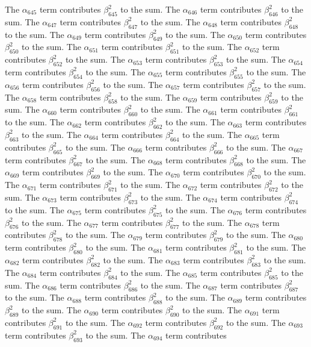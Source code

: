 \begin{lemma}
The $\alpha_{645}$ term contributes $\beta_{645}^{2}$ to the sum. The $\alpha_{646}$ term contributes $\beta_{646}^{2}$ to the sum. The $\alpha_{647}$ term contributes $\beta_{647}^{2}$ to the sum. The $\alpha_{648}$ term contributes $\beta_{648}^{2}$ to the sum. The $\alpha_{649}$ term contributes $\beta_{649}^{2}$ to the sum. The $\alpha_{650}$ term contributes $\beta_{650}^{2}$ to the sum. The $\alpha_{651}$ term contributes $\beta_{651}^{2}$ to the sum. The $\alpha_{652}$ term contributes $\beta_{652}^{2}$ to the sum. The $\alpha_{653}$ term contributes $\beta_{653}^{2}$ to the sum. The $\alpha_{654}$ term contributes $\beta_{654}^{2}$ to the sum. The $\alpha_{655}$ term contributes $\beta_{655}^{2}$ to the sum. The $\alpha_{656}$ term contributes $\beta_{656}^{2}$ to the sum. The $\alpha_{657}$ term contributes $\beta_{657}^{2}$ to the sum. The $\alpha_{658}$ term contributes $\beta_{658}^{2}$ to the sum. The $\alpha_{659}$ term contributes $\beta_{659}^{2}$ to the sum. The $\alpha_{660}$ term contributes $\beta_{660}^{2}$ to the sum. The $\alpha_{661}$ term contributes $\beta_{661}^{2}$ to the sum. The $\alpha_{662}$ term contributes $\beta_{662}^{2}$ to the sum. The $\alpha_{663}$ term contributes $\beta_{663}^{2}$ to the sum. The $\alpha_{664}$ term contributes $\beta_{664}^{2}$ to the sum. The $\alpha_{665}$ term contributes $\beta_{665}^{2}$ to the sum. The $\alpha_{666}$ term contributes $\beta_{666}^{2}$ to the sum. The $\alpha_{667}$ term contributes $\beta_{667}^{2}$ to the sum. The $\alpha_{668}$ term contributes $\beta_{668}^{2}$ to the sum. The $\alpha_{669}$ term contributes $\beta_{669}^{2}$ to the sum. The $\alpha_{670}$ term contributes $\beta_{670}^{2}$ to the sum. The $\alpha_{671}$ term contributes $\beta_{671}^{2}$ to the sum. The $\alpha_{672}$ term contributes $\beta_{672}^{2}$ to the sum. The $\alpha_{673}$ term contributes $\beta_{673}^{2}$ to the sum. The $\alpha_{674}$ term contributes $\beta_{674}^{2}$ to the sum. The $\alpha_{675}$ term contributes $\beta_{675}^{2}$ to the sum. The $\alpha_{676}$ term contributes $\beta_{676}^{2}$ to the sum. The $\alpha_{677}$ term contributes $\beta_{677}^{2}$ to the sum. The $\alpha_{678}$ term contributes $\beta_{678}^{2}$ to the sum. The $\alpha_{679}$ term contributes $\beta_{679}^{2}$ to the sum. The $\alpha_{680}$ term contributes $\beta_{680}^{2}$ to the sum. The $\alpha_{681}$ term contributes $\beta_{681}^{2}$ to the sum. The $\alpha_{682}$ term contributes $\beta_{682}^{2}$ to the sum. The $\alpha_{683}$ term contributes $\beta_{683}^{2}$ to the sum. The $\alpha_{684}$ term contributes $\beta_{684}^{2}$ to the sum. The $\alpha_{685}$ term contributes $\beta_{685}^{2}$ to the sum. The $\alpha_{686}$ term contributes $\beta_{686}^{2}$ to the sum. The $\alpha_{687}$ term contributes $\beta_{687}^{2}$ to the sum. The $\alpha_{688}$ term contributes $\beta_{688}^{2}$ to the sum. The $\alpha_{689}$ term contributes $\beta_{689}^{2}$ to the sum. The $\alpha_{690}$ term contributes $\beta_{690}^{2}$ to the sum. The $\alpha_{691}$ term contributes $\beta_{691}^{2}$ to the sum. The $\alpha_{692}$ term contributes $\beta_{692}^{2}$ to the sum. The $\alpha_{693}$ term contributes $\beta_{693}^{2}$ to the sum. The $\alpha_{694}$ term contributes 
\end{lemma}
